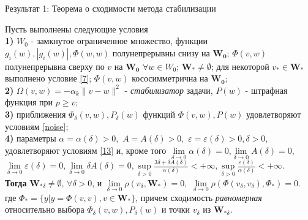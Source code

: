 \documentclass[unicode, t, 11pt]{beamer}%
\begin{document}
\begin{frame}
\frametitle{\insertsection}
\framesubtitle{\insertsubsection}
\begin{block}{Результат 1: Теорема о сходимости метода стабилизации}\begin{footnotesize}
	Пусть выполнены следующие условия\\
	\textbf{1)} $W_0$ - замкнутое ограниченное множество, функции $g_i(w),|g_i(w)|,\Phi(w,w)$ полунепрерывны снизу на $\mathbf{W_0}$; $\Phi(v,w)$ полунепрерывна сверху по $v$ на $\mathbf{W_0}$ $\forall w\in W_0$; $\mathbf{W_*}\ne\emptyset$; для некоторой $v_*\in \mathbf{W_*}$ выполнено условие \eqref{7}; $\Phi(v,w)$ кососимметрична на $\mathbf{W_0}$;\\
	\textbf{2)} $\Omega(v,w)=-\alpha_k\|v-w\|^2$ - \textit{стабилизатор} задачи, $P(w)$ - штрафная функция при $p\geqslant v$;\\
	\textbf{3)} приближения $\Phi_{\delta}(v,w),P_{\delta}(w)$ функций $\Phi(v,w),P(w)$ удовлетворяют условиям \eqref{noise};\\
	\textbf{4)} параметры $\alpha=\alpha(\delta)>0,$ $A=A(\delta)>0,$ $\varepsilon=\varepsilon(\delta)>0,\delta>0$, удовлетворяют условиям \eqref{13} и, кроме того
	$\lim\limits_{\delta\rightarrow 0}\alpha(\delta)=0$,$\lim\limits_{\delta\rightarrow 0}A(\delta)=0$,$\lim\limits_{\delta\rightarrow 0}\varepsilon(\delta)=0,\lim\limits_{\delta\rightarrow 0} \delta A(\delta)=0,\sup\limits_{\delta>0}\frac{3\delta+\delta A(\delta)}{\alpha(\delta)}<+\infty, \sup\limits_{\delta>0}\frac{\varepsilon(\delta)}{\alpha(\delta)}<+\infty.$\\
	\textbf{Тогда} $\mathbf{W}_{*\delta}\ne\emptyset,\,\forall\delta>0$, и $\lim\limits_{\delta\rightarrow 0}\rho(v_{\delta},\mathbf{W_*})=0,$ $\lim\limits_{\delta\rightarrow 0} \rho(\Phi(v_{\delta},v_{\delta}),\Phi_*)=0$.
	где $\Phi_*=\{y|y=\Phi(v,v),v\in \mathbf{W_*}\}$, причем сходимость \textit{равномерная} относительно выбора $\Phi_{\delta}(v,w),P_{\delta}(w)$ и точки $v_{\delta}$ из $\mathbf{W}_{*\delta}$.
	\end{footnotesize}
\end{block}
\end{frame}
\end{document}

